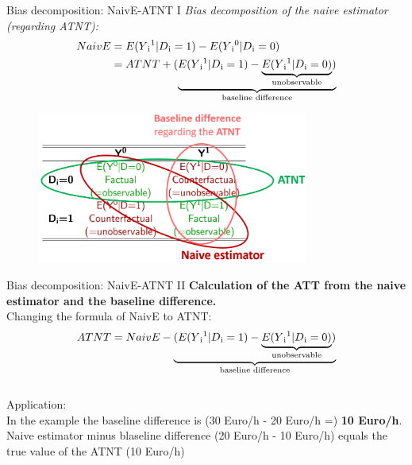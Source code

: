\documentclass{beamer}\usepackage[]{graphicx}\usepackage[]{color}
\begin{document}
\begin{frame}{Bias decomposition: NaivE-ATNT I}
\textit{Bias decomposition of the naive estimator (regarding ATNT):}
\begin{align*}
NaivE &= E(Y\textsubscript{i}\textsuperscript{1}\vert D\textsubscript{i}=1)-E(Y\textsubscript{i}\textsuperscript{0} \vert D\textsubscript{i}=0) \\
&= ATNT + (\underbrace{E(Y\textsubscript{i}\textsuperscript{1} \vert D\textsubscript{i}=1) - \underbrace{E(Y\textsubscript{i}\textsuperscript{1} \vert D\textsubscript{i}=0)}_\text{unobservable})}_\text{baseline difference}
\end{align*}
\begin{figure}
\centering
\includegraphics[width=0.8\textwidth]{Graphics/Naive_ATNT_Baseline.png}
\end{figure}
\end{frame}

\begin{frame}{Bias decomposition: NaivE-ATNT II}
\textbf{Calculation of the ATT from the naive estimator and the baseline difference.}
\\[1em]
Changing the formula of NaivE to ATNT: \\
\begin{align*}
ATNT = NaivE - \underbrace{(E(Y\textsubscript{i}\textsuperscript{1} \vert D\textsubscript{i}=1) - \underbrace{E(Y\textsubscript{i}\textsuperscript{1} \vert D\textsubscript{i}=0)}_\text{unobservable})}_\text{baseline difference}
\end{align*}
\\[1em]
Application:\\
In the example the baseline difference is (30 Euro/h - 20 Euro/h =) \textbf{10 Euro/h}. Naive estimator minus blaseline difference (20 Euro/h - 10 Euro/h) equals the true value of the ATNT (10 Euro/h)
\end{frame}
\end{document}

